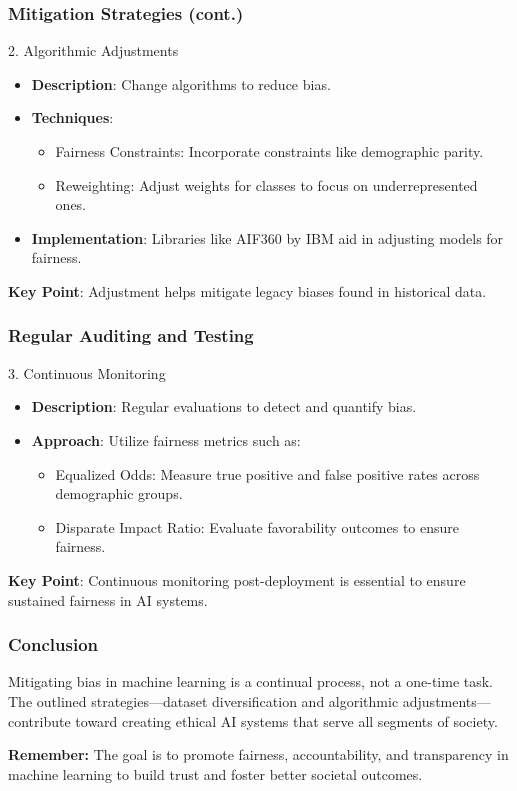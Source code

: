 \documentclass[aspectratio=169]{beamer}
\begin{document}
\begin{frame}[fragile]
    \frametitle{Mitigation Strategies (cont.)}
    \begin{block}{2. Algorithmic Adjustments}
        \begin{itemize}
            \item \textbf{Description}: Change algorithms to reduce bias.
            \item \textbf{Techniques}:
            \begin{itemize}
                \item Fairness Constraints: Incorporate constraints like demographic parity.
                \item Reweighting: Adjust weights for classes to focus on underrepresented ones.
            \end{itemize}
            \item \textbf{Implementation}: Libraries like AIF360 by IBM aid in adjusting models for fairness.
        \end{itemize}
        \textbf{Key Point}: Adjustment helps mitigate legacy biases found in historical data.
    \end{block}
\end{frame}

\begin{frame}[fragile]
    \frametitle{Regular Auditing and Testing}
    \begin{block}{3. Continuous Monitoring}
        \begin{itemize}
            \item \textbf{Description}: Regular evaluations to detect and quantify bias.
            \item \textbf{Approach}: Utilize fairness metrics such as:
            \begin{itemize}
                \item Equalized Odds: Measure true positive and false positive rates across demographic groups.
                \item Disparate Impact Ratio: Evaluate favorability outcomes to ensure fairness.
            \end{itemize}
        \end{itemize}
        \textbf{Key Point}: Continuous monitoring post-deployment is essential to ensure sustained fairness in AI systems.
    \end{block}
\end{frame}

\begin{frame}[fragile]
    \frametitle{Conclusion}
    Mitigating bias in machine learning is a continual process, not a one-time task. The outlined strategies—dataset diversification and algorithmic adjustments—contribute toward creating ethical AI systems that serve all segments of society. 

    \textbf{Remember:} The goal is to promote fairness, accountability, and transparency in machine learning to build trust and foster better societal outcomes.
\end{frame}
\end{document}
